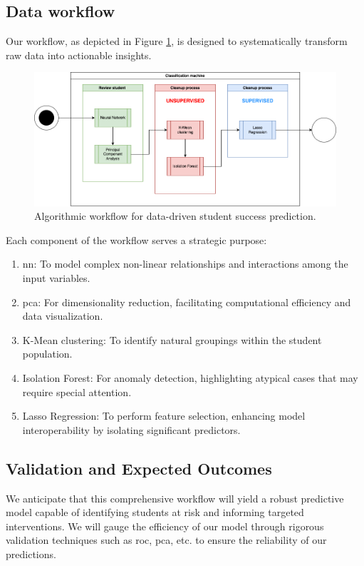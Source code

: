 \documentclass[../main.tex]{subfiles}
\begin{document}
\subsection{Data workflow}
\label{subsec:conceptualimplementation_dataworkflow}

Our workflow, as depicted in Figure \ref{fig:dataworkflow}, is designed to systematically transform raw data into actionable insights.

\begin{figure}
    \centering
    \includegraphics[width=1\linewidth]{res//diagram/ML Workflow.png}
    \caption{Algorithmic workflow for data-driven student success prediction.}
    \label{fig:dataworkflow}
\end{figure}

Each component of the workflow serves a strategic purpose:

\begin{enumerate}
    \item \acrfull{nn}: To model complex non-linear relationships and interactions among the input variables.
    \item \acrfull{pca}: For dimensionality reduction, facilitating computational efficiency and data visualization.
    \item K-Mean clustering: To identify natural groupings within the student population.
    \item Isolation Forest: For anomaly detection, highlighting atypical cases that may require special attention.
    \item Lasso Regression: To perform feature selection, enhancing model interoperability by isolating significant predictors.
\end{enumerate}

\subsection{Validation and Expected Outcomes}
We anticipate that this comprehensive workflow will yield a robust predictive model capable of identifying students at risk and informing targeted interventions. We will gauge the efficiency of our model through rigorous validation techniques such as \acrfull{roc}, \acrfull{pca}, etc. to ensure the reliability of our predictions. 
\end{document}
